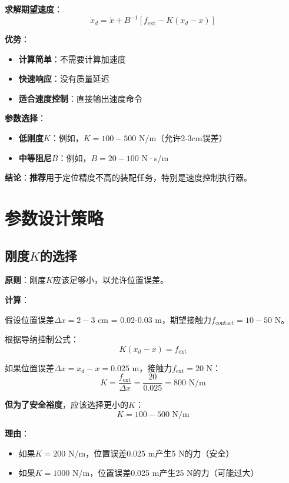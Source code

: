 \documentclass[12pt,a4paper]{article}
\begin{document}
\textbf{求解期望速度}：
\begin{equation}
\dot{x}_d = \dot{x} + B^{-1}[f_{\text{ext}} - K(x_d - x)]
\end{equation}

\textbf{优势}：
\begin{itemize}
\item \textbf{计算简单}：不需要计算加速度
\item \textbf{快速响应}：没有质量延迟
\item \textbf{适合速度控制}：直接输出速度命令
\end{itemize}

\textbf{参数选择}：
\begin{itemize}
\item \textbf{低刚度$K$}：例如，$K = 100-500$ N/m（允许2-3cm误差）
\item \textbf{中等阻尼$B$}：例如，$B = 20-100$ N·s/m
\end{itemize}

\textbf{结论}：\textbf{推荐}用于定位精度不高的装配任务，特别是速度控制执行器。

\section{参数设计策略}

\subsection{刚度$K$的选择}

\textbf{原则}：刚度$K$应该足够小，以允许位置误差。

\textbf{计算}：

假设位置误差$\Delta x = 2-3$ cm = 0.02-0.03 m，期望接触力$f_{\text{contact}} = 10-50$ N。

根据导纳控制公式：
\begin{equation}
K(x_d - x) = f_{\text{ext}}
\end{equation}

如果位置误差$\Delta x = x_d - x = 0.025$ m，接触力$f_{\text{ext}} = 20$ N：
\begin{equation}
K = \frac{f_{\text{ext}}}{\Delta x} = \frac{20}{0.025} = 800 \text{ N/m}
\end{equation}

\textbf{但为了安全裕度}，应该选择更小的$K$：
\begin{equation}
K = 100-500 \text{ N/m}
\end{equation}

\textbf{理由}：
\begin{itemize}
\item 如果$K = 200$ N/m，位置误差0.025 m产生5 N的力（安全）
\item 如果$K = 1000$ N/m，位置误差0.025 m产生25 N的力（可能过大）
\end{itemize}
\end{document}

